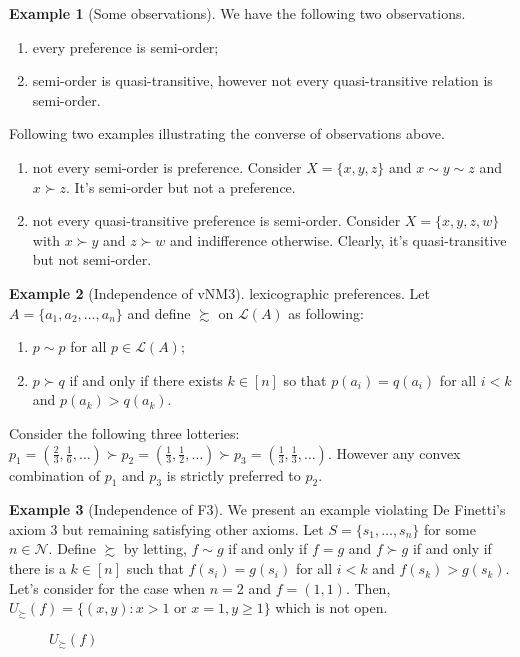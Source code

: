 \documentclass[12pt, a4paper]{article}
\theoremstyle{definition}
\newtheorem{example}{Example}
\newcommand{\m}[1]{\mathcal{#1}}
\begin{document}
\begin{example}[Some observations]
We have the following two observations.
\begin{enumerate}[label = (\roman*)]
\item every preference is semi-order;
\item semi-order is quasi-transitive, however not every quasi-transitive relation is semi-order.
\end{enumerate}
Following two examples illustrating the converse of observations above.
\begin{enumerate}[label = (\roman*)]
\item not every semi-order is preference. Consider $X=\{x,y,z\}$ and $x\sim y\sim z$ and $x\succ z$. It's semi-order but not a preference.
\item not every quasi-transitive preference is semi-order. Consider $X=\{x,y,z,w\}$ with $x\succ y$ and $z\succ w$ and indifference otherwise. Clearly, it's quasi-transitive but not semi-order.
\end{enumerate}
\end{example}

\begin{example}[Independence of vNM3]
lexicographic preferences. Let $A=\{a_1,a_2,\dots,a_n\}$ and define $\succsim$ on $\m{L}(A)$ as following:
\begin{enumerate}
\item $p\sim p$ for all $p\in\m{L}(A)$;
\item $p\succ q$ if and only if there exists $k\in[n]$ so that $p(a_i) = q(a_i)$ for all $i<k$ and $p(a_k)>q(a_k)$.
\end{enumerate}
Consider the following three lotteries: $p_1 = (\frac{2}{3},\frac{1}{6},\dots)\succ p_2 = (\frac{1}{3},\frac{1}{2},\dots)\succ p_3 = (\frac{1}{3},\frac{1}{3},\dots)$. However any convex combination of $p_1$ and $p_3$ is strictly preferred to $p_2$.
\end{example}

\begin{example}[Independence of F3]
We present an example violating De Finetti's axiom $3$ but remaining satisfying other axioms. Let $S=\{s_1,\dots,s_n\}$ for some $n\in \mathcal{N}$. Define $\succsim$ by letting, $f\sim g$ if and only if $f=g$ and $f\succ g$ if and only if there is a $k\in[n]$ such that $f(s_i)=g(s_i)$ for all $i<k$ and $f(s_k)>g(s_k)$. Let's consider for the case when $n=2$ and $f=(1,1)$. Then, $U_{\succsim}(f) = \{(x,y):x>1\text{ or }x=1,y\geq 1\}$ which is not open.

\begin{figure}[h!]
\centering
{}
\caption{$U_{\succsim}(f)$}
\end{figure}
\end{example}
\end{document}
